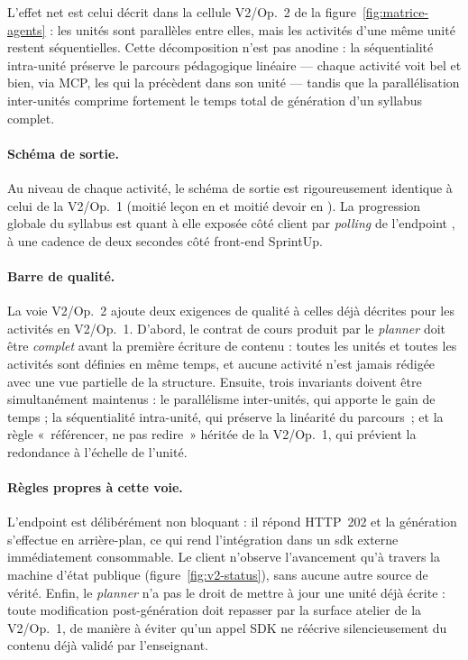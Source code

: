 L'effet net est celui décrit dans la cellule V2/Op.~2 de la
figure~\ref{fig:matrice-agents} : les unités sont parallèles entre
elles, mais les activités d'une même unité restent séquentielles.
Cette décomposition n'est pas anodine : la séquentialité intra-unité
préserve le parcours pédagogique linéaire — chaque activité voit
bel et bien, via MCP, les  qui la précèdent dans son
unité — tandis que la parallélisation inter-unités comprime
fortement le temps total de génération d'un syllabus complet.

\paragraph{Schéma de sortie.} Au niveau de chaque activité, le
schéma de sortie est rigoureusement identique à celui de la V2/Op.~1
(moitié leçon en  et moitié devoir en
). La progression globale du syllabus est
quant à elle exposée côté client par \emph{polling} de l'endpoint
, à une cadence de deux secondes
côté front-end SprintUp.

\paragraph{Barre de qualité.} La voie V2/Op.~2 ajoute deux exigences
de qualité à celles déjà décrites pour les activités en V2/Op.~1.
D'abord, le contrat de cours produit par le \emph{planner} doit être
\emph{complet} avant la première écriture de contenu : toutes les
unités et toutes les activités sont définies en même temps, et
aucune activité n'est jamais rédigée avec une vue partielle de la
structure. Ensuite, trois invariants doivent être simultanément
maintenus : le parallélisme inter-unités, qui apporte le gain de
temps ; la séquentialité intra-unité, qui préserve la linéarité du
parcours~; et la règle «~référencer, ne pas redire~» héritée de la
V2/Op.~1, qui prévient la redondance à l'échelle de l'unité.

\paragraph{Règles propres à cette voie.} L'endpoint est délibérément
non bloquant : il répond \textsc{HTTP}~202 et la génération s'effectue
en arrière-plan, ce qui rend l'intégration dans un \gls{sdk} externe
immédiatement consommable. Le client n'observe l'avancement
qu'à travers la machine d'état publique (figure~\ref{fig:v2-status}),
sans aucune autre source de vérité. Enfin, le \emph{planner} n'a pas
le droit de mettre à jour une unité déjà écrite : toute modification
post-génération doit repasser par la surface atelier de la V2/Op.~1,
de manière à éviter qu'un appel SDK ne réécrive silencieusement du
contenu déjà validé par l'enseignant.


